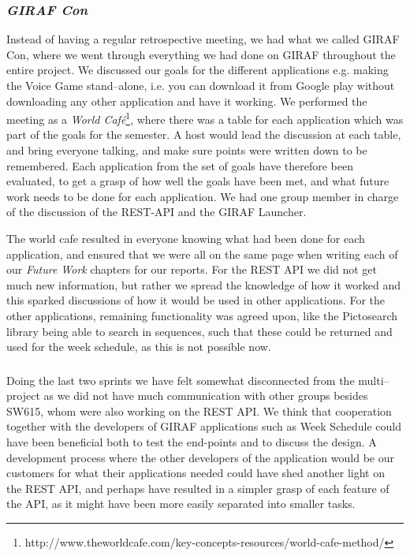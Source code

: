 \subsubsection*{\textit{GIRAF Con}}
Instead of having a regular retrospective meeting, we had what we called GIRAF Con, where we went through everything we had done on GIRAF throughout the entire project.
We discussed our goals for the different applications e.g. making the Voice Game stand--alone, i.e. you can download it from Google play without downloading any other application and have it working. 
We performed the meeting as a \textit{World Café}\footnote{http://www.theworldcafe.com/key-concepts-resources/world-cafe-method/}, where there was a table for each application which was part of the goals for the semester.
A host would lead the discussion at each table, and bring everyone talking, and make sure points were written down to be remembered.
Each application from the set of goals have therefore been evaluated, to get a grasp of how well the goals have been met, and what future work needs to be done for each application.
We had one group member in charge of the discussion of the REST-API and the GIRAF Launcher.


The world cafe resulted in everyone knowing what had been done for each application, and ensured that we were all on the same page when writing each of our \textit{Future Work} chapters for our reports. 
For the REST API we did not get much new information, but rather we spread the knowledge of how it worked and this sparked discussions of how it would be used in other applications.
For the other applications, remaining functionality was agreed upon, like the Pictosearch library being able to search in sequences, such that these could be returned and used for the week schedule, as this is not possible now.

\subsubsection*{}
Doing the last two sprints we have felt somewhat disconnected from the multi--project as we did not have much communication with other groups besides SW615, whom were also working on the REST API.
We think that cooperation together with the developers of GIRAF applications such as Week Schedule could have been beneficial both to test the end-points and to discuss the design.
A development process where the other developers of the application would be our customers for what their applications needed could have shed another light on the REST API, and perhaps have resulted in a simpler grasp of each feature of the API, as it might have been more easily separated into smaller tasks.

